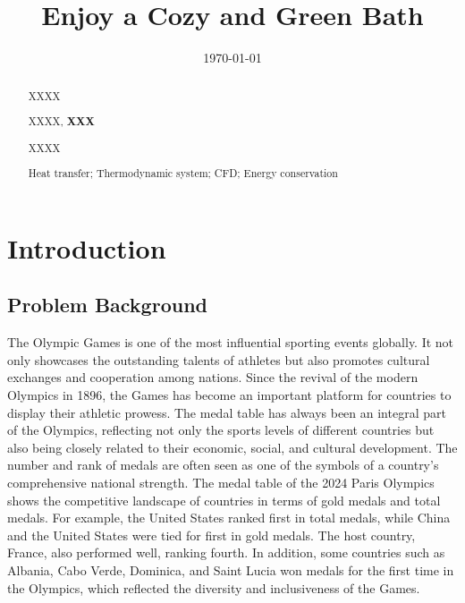 \documentclass{mcmthesis}
\title{Enjoy a Cozy and Green Bath}
\date{\today}
\renewcommand{\contentsname}{\hspace*{\fill}\Large\bfseries Contents \hspace*{\fill}}
\begin{document}
\begin{abstract}

XXXX

XXXX, \textbf{XXX}

XXXX

\begin{keywords}
Heat transfer; Thermodynamic system; CFD; Energy conservation
\end{keywords}

\end{abstract}

\maketitle

\tableofcontents   %
\thispagestyle{empty}

\newpage

\section{Introduction}

\subsection{Problem Background}

The Olympic Games is one of the most influential sporting events globally. It not only showcases the outstanding talents of athletes but also promotes cultural exchanges and cooperation among nations. Since the revival of the modern Olympics in 1896, the Games has become an important platform for countries to display their athletic prowess. The medal table has always been an integral part of the Olympics, reflecting not only the sports levels of different countries but also being closely related to their economic, social, and cultural development. The number and rank of medals are often seen as one of the symbols of a country's comprehensive national strength. The medal table of the 2024 Paris Olympics shows the competitive landscape of countries in terms of gold medals and total medals. For example, the United States ranked first in total medals, while China and the United States were tied for first in gold medals. The host country, France, also performed well, ranking fourth. In addition, some countries such as Albania, Cabo Verde, Dominica, and Saint Lucia won medals for the first time in the Olympics, which reflected the diversity and inclusiveness of the Games.
\end{document}
